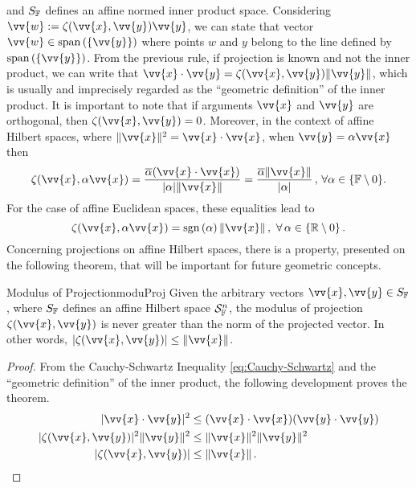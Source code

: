 and $S_\cam{F}$ defines an affine normed inner product space. Considering $\vv{w}:=\fua{\zeta}{\vv{x},\vv{y}}\vv{y}$, we can state that vector $\vv{w}\in\spn{(\{\vv{y}\})}$ where points $w$ and $y$ belong to the line defined by $\spn{(\{\vv{y}\})}$. From the previous rule, if projection is known and not the inner product, we can write that $\vv{x}\cdot \vv{y}=\fua{\zeta}{\vv{x},\vv{y}}\|\vv{y}\|$, which is usually and imprecisely regarded as the ``geometric definition'' of the inner product. It is important to note that if arguments $\vv{x}$ and $\vv{y}$ are orthogonal, then $\fua{\zeta}{\vv{x},\vv{y}}=0$.
 Moreover, in the context of affine Hilbert spaces, where $\|\vv{x}\|^2=\vv{x}\cdot \vv{x}$, when $\vv{y}=\alpha\vv{x}$ then
\begin{equation}\label{eq:projColinear}
\fua{\zeta}{\vv{x},\alpha\vv{x}}=\dfrac{\overline{\alpha}(\vv{x}\cdot \vv{x})}{|\alpha|\|\vv{x}\|}=\dfrac{\overline{\alpha}\|\vv{x}\|}{|\alpha|}\,,\,\forall\alpha\in\{\cam{F}\setminus 0\}.
\end{equation}
For the case of affine Euclidean spaces, these equalities lead to
\begin{equation}\label{eq:projColinearEuclid}
\fua{\zeta}{\vv{x},\alpha\vv{x}}=\sgn{\alpha}\|\vv{x}\|\,,\,\,\forall\,\alpha\in\{\real\setminus 0\}\,.
\end{equation}
Concerning projections on affine Hilbert spaces, there is a property, presented on the following theorem, that will be important for future geometric concepts.

\begin{mteo}{Modulus of Projection}{moduProj}
Given the arbitrary vectors $\vv{x},\vv{y}\in S_\cam{F}$, where $S_\cam{F}$ defines an affine Hilbert space $\eamd{S}{F}{n}$, the modulus of projection $\fua{\zeta}{\vv{x},\vv{y}}$ is never greater than the norm of the projected vector. In other words,
$|\fua{\zeta}{\vv{x},\vv{y}}|\leq \|\vv{x}\|$.
\end{mteo}
\hspace{1pt}
{\footnotesize
\begin{proof}
From the Cauchy-Schwartz Inequality \eqref{eq:Cauchy-Schwartz} and the ``geometric definition'' of the inner product, the following development proves the theorem.
\begin{align*}
|\vv{x}\cdot\vv{y}|^2 &\leq (\vv{x}\cdot\vv{x})(\vv{y}\cdot\vv{y})\\
|\fua{\zeta}{\vv{x},\vv{y}}|^2\|\vv{y}\|^2 &\leq \|\vv{x}\|^2\|\vv{y}\|^2\\
|\fua{\zeta}{\vv{x},\vv{y}}| &\leq \|\vv{x}\|\,.
\end{align*}
\end{proof}}


